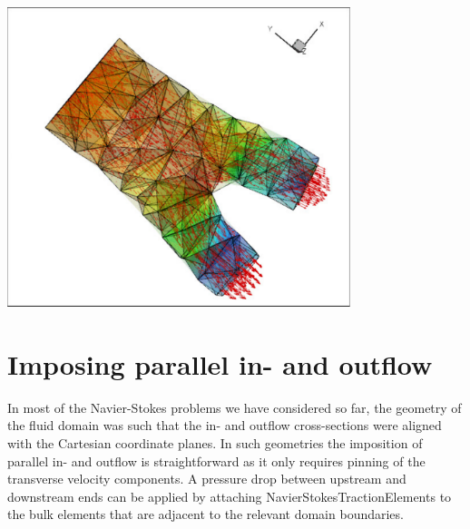  
\begin{DoxyImage}
\includegraphics[width=0.75\textwidth]{vmtk_fluid2}
\end{DoxyImage}




 

\hypertarget{index_parallel_flow}{}\section{Imposing parallel in-\/ and outflow}\label{index_parallel_flow}
In most of the Navier-\/\+Stokes problems we have considered so far, the geometry of the fluid domain was such that the in-\/ and outflow cross-\/sections were aligned with the Cartesian coordinate planes. In such geometries the imposition of parallel in-\/ and outflow is straightforward as it only requires pinning of the transverse velocity components. A pressure drop between upstream and downstream ends can be applied by attaching {\ttfamily Navier\+Stokes\+Traction\+Elements} to the bulk elements that are adjacent to the relevant domain boundaries.

